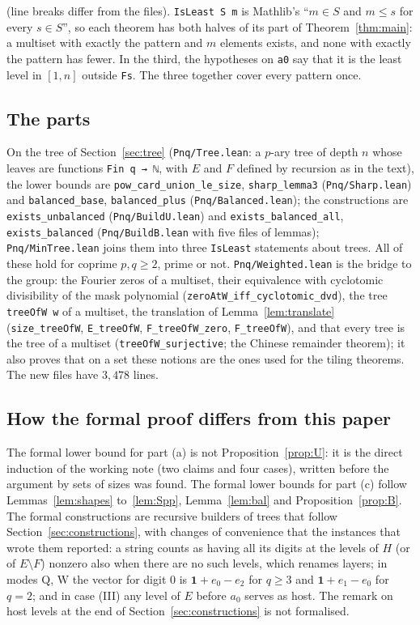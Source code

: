 \documentclass[11pt,a4paper]{amsart}
\theoremstyle{definition}
\theoremstyle{remark}
\newcommand{\one}{\mathbf{1}}
\newcommand{\lean}[1]{\texttt{#1}}
\begin{document}
\noindent (line breaks differ from the files). \lean{IsLeast S m} is Mathlib's ``$m\in S$ and $m\le s$ for
every $s\in S$'', so each theorem has both halves of its part of Theorem~\ref{thm:main}: a multiset with exactly
the pattern and $m$ elements exists, and none with exactly the pattern has fewer. In the third, the
hypotheses on \lean{a0} say that it is the least level in $[1,n]$ outside \lean{Fs}. The three together cover
every pattern once.

\subsection*{The parts} \sloppy On the tree of Section~\ref{sec:tree} (\lean{Pnq/Tree.lean}: a $p$-ary tree of depth
$n$ whose leaves are functions \lean{Fin q → ℕ}, with $E$ and $F$ defined by recursion as in the text), the
lower bounds are \lean{pow\_card\_union\_le\_size}, \lean{sharp\_lemma3} (\lean{Pnq/Sharp.lean}) and
\lean{balanced\_base}, \lean{balanced\_plus} (\lean{Pnq/Balanced.lean}); the constructions are
\lean{exists\_unbalanced} (\lean{Pnq/BuildU.lean}) and \lean{exists\_balanced\_all}, \lean{exists\_balanced}
(\lean{Pnq/BuildB.lean} with five files of lemmas); \lean{Pnq/MinTree.lean} joins them into three
\lean{IsLeast} statements about trees. All of these hold for coprime $p,q\ge2$, prime or not.
\lean{Pnq/Weighted.lean} is the bridge to the group: the Fourier zeros of a multiset, their equivalence with
cyclotomic divisibility of the mask polynomial (\lean{zeroAtW\_iff\_cyclotomic\_dvd}), the tree
\lean{treeOfW w} of a multiset, the translation of Lemma~\ref{lem:translate} (\lean{size\_treeOfW},
\lean{E\_treeOfW}, \lean{F\_treeOfW\_zero}, \lean{F\_treeOfW}), and that every tree is the tree of a
multiset (\lean{treeOfW\_surjective}; the Chinese remainder theorem); it also proves that on a set these
notions are the ones used for the tiling theorems. The new files have $3{,}478$ lines.

\subsection*{How the formal proof differs from this paper} The formal lower bound for part (a) is not
Proposition~\ref{prop:U}: it is the direct induction of the working note (two claims and four cases), written
before the argument by sets of sizes was found. The formal lower bounds for part (c) follow
Lemmas~\ref{lem:shapes} to~\ref{lem:Spp}, Lemma~\ref{lem:bal} and Proposition~\ref{prop:B}. The formal constructions are recursive
builders of trees that follow Section~\ref{sec:constructions}, with changes of convenience that the instances
that wrote them reported: a string counts as having all its digits at the levels of $H$ (or of
$E\setminus F$) nonzero also when there are no such levels, which renames layers; in modes $\mathrm Q$,
$\mathrm W$ the vector for digit $0$ is $\one+e_0-e_2$ for $q\ge3$ and $\one+e_1-e_0$ for $q=2$; and in case
(III) any level of $E$ before $a_0$ serves as host. The remark on host levels at the end of
Section~\ref{sec:constructions} is not formalised.
\end{document}
